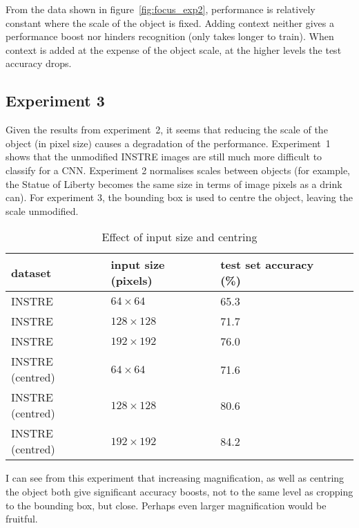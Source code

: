 From the data shown in figure~\ref{fig:focus_exp2}, performance is relatively constant where the scale of the object is fixed. Adding context neither gives a performance boost nor hinders recognition (only takes longer to train). When context is added at the expense of the object scale, at the higher levels the test accuracy drops.


\subsection {Experiment 3}

Given the results from experiment~2, it seems that reducing the scale of the object (in pixel size) causes a degradation of the performance. Experiment~1 shows that the unmodified INSTRE images are still much more difficult to classify for a CNN. Experiment 2 normalises scales between objects (for example, the Statue of Liberty becomes the same size in terms of image pixels as a drink can). For experiment 3, the bounding box is used to centre the object, leaving the scale unmodified.


\begin{table}[h]
  \centering
    \caption{Effect of input size and centring}
    
  \begin{tabular}{ l l l l }
    
    dataset & input size (pixels) & test set accuracy (\%) \\
    \toprule
    
    INSTRE &  $ 64 \times 64 $ & 65.3 \\
    INSTRE &  $ 128 \times 128 $  & 71.7 \\
    INSTRE &  $ 192 \times 192 $  & 76.0 \\
    
    \toprule
    INSTRE (centred) &  $ 64 \times 64 $ & 71.6 \\
    INSTRE (centred) &  $ 128 \times 128 $  & 80.6 \\
    INSTRE (centred) &  $ 192 \times 192 $  & 84.2 \\
    
    
    
    \bottomrule
  \end{tabular}
\label{fig:focus_input_size}
\end{table}



I can see from this experiment that increasing magnification, as well as centring the object both give significant accuracy boosts, not to the same level as cropping to the bounding box, but close. Perhaps even larger magnification would be fruitful. 

